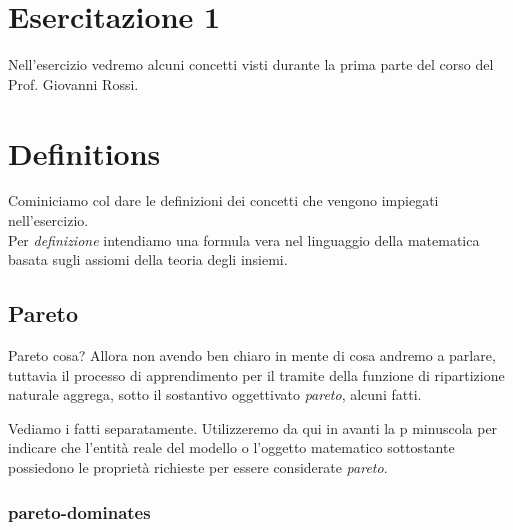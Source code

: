 \chapter{Esercitazione 1}
Nell'esercizio vedremo alcuni concetti visti durante la prima parte del corso del Prof. Giovanni Rossi.


\chapter{Definitions}
Cominiciamo col dare le definizioni dei concetti che vengono impiegati nell'esercizio. \\
Per \emph{definizione} intendiamo una formula vera nel linguaggio della matematica basata sugli assiomi della teoria degli insiemi. \\

\section{Pareto}
Pareto cosa? Allora non avendo ben chiaro in mente di cosa andremo a parlare, tuttavia il processo di apprendimento per il tramite della funzione di ripartizione naturale aggrega,
sotto il sostantivo oggettivato \emph{pareto}, alcuni fatti.

Vediamo i fatti separatamente. Utilizzeremo da qui in avanti la p minuscola per indicare che l'entit\`a reale del modello o l'oggetto matematico sottostante possiedono le propriet\`a 
richieste per essere considerate \emph{pareto}.

\subsection{pareto-dominates}

